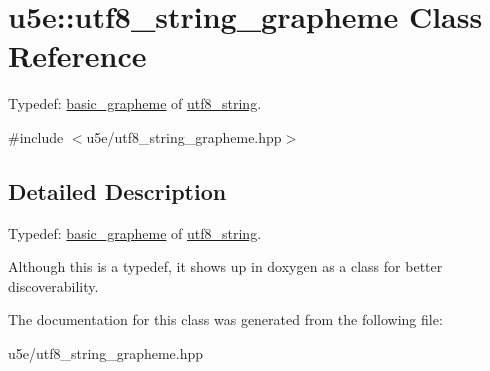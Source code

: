 \hypertarget{classu5e_1_1utf8__string__grapheme}{}\section{u5e\+:\+:utf8\+\_\+string\+\_\+grapheme Class Reference}
\label{classu5e_1_1utf8__string__grapheme}


Typedef\+: \hyperlink{classu5e_1_1basic__grapheme}{basic\+\_\+grapheme} of \hyperlink{classu5e_1_1utf8__string}{utf8\+\_\+string}.  




{\ttfamily \#include $<$u5e/utf8\+\_\+string\+\_\+grapheme.\+hpp$>$}



\subsection{Detailed Description}
Typedef\+: \hyperlink{classu5e_1_1basic__grapheme}{basic\+\_\+grapheme} of \hyperlink{classu5e_1_1utf8__string}{utf8\+\_\+string}. 

Although this is a typedef, it shows up in doxygen as a class for better discoverability. 

The documentation for this class was generated from the following file\+:\begin{DoxyCompactItemize}
\item 
u5e/utf8\+\_\+string\+\_\+grapheme.\+hpp\end{DoxyCompactItemize}
